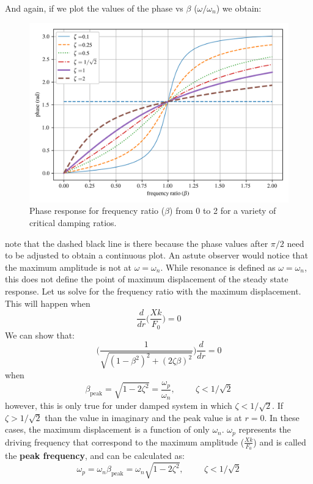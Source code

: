 \documentclass[12pt,letter]{article}
\numberwithin{ex}{section} %
\numberwithin{re}{section} %
\begin{document}
			\noindent And again, if we plot the values of the phase vs $\beta$ ($\omega/\omega_n$) we obtain:
			\begin{figure}[H]
				\centering
				\includegraphics[]{../figures/underdamped_frequency_response_phase.png}
				\caption{Phase response for frequency ratio ($\beta$) from 0 to 2 for a variety of critical damping ratios.}
			\end{figure}				
			\noindent note that the dashed black line is there because the phase values after $\pi/2$ need to be adjusted to obtain a continuous plot. An astute observer would notice that the maximum amplitude is not at $\omega = \omega_n$. While resonance is defined as $\omega = \omega_n$, this does not define the point of maximum displacement of the steady state response. Let us solve for the frequency ratio with the maximum displacement. This will happen when
			\begin{equation}
				\frac{d}{dr}\Bigg(\frac{Xk}{F_0} \Bigg)= 0
			\end{equation}				
			We can show that:
			\begin{equation}
			\Bigg(\frac{1}{\sqrt{(1-\beta^2)^2+(2\zeta \beta)^2}}\Bigg)	\frac{d}{dr} =0
			\end{equation}	
			when 
			\begin{equation}
			\beta_{\text{peak}} = \sqrt{1-2 \zeta^2}= \frac{\omega_p}{\omega_n}, \hspace{1cm} \zeta<1/\sqrt{2} 
			\end{equation}				
			however, this is only true for under damped system in which $\zeta<1/\sqrt{2}$. If $\zeta>1/\sqrt{2}$ than the value in imaginary and the peak value is at $r=0$. In these cases, the maximum displacement is a function of only $\omega_n$. $\omega_p$ represents the driving frequency that correspond to the maximum amplitude ($\frac{Xk}{F_0}$) and is called the \textbf{peak frequency}, and can be calculated as:
			\begin{equation}
			\omega_p = \omega_n \beta_{\text{peak}} = \omega_n \sqrt{1-2 \zeta^2}, \hspace{1cm} \zeta<1/\sqrt{2} 
			\end{equation}				
			
\end{document}
